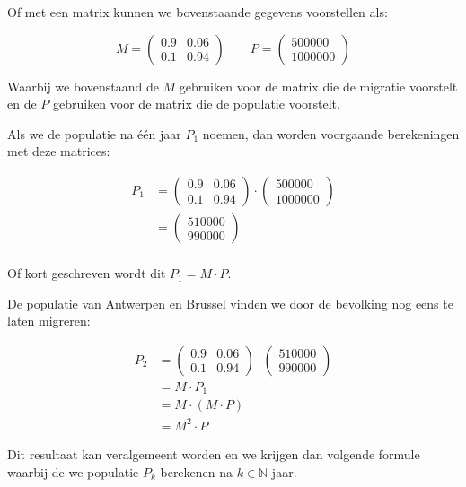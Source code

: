 \documentclass[12pt,twoside]{article}
\begin{document}
Of met een matrix kunnen we bovenstaande gegevens voorstellen als:

\[
  M=\begin{pmatrix}0.9 & 0.06\\ 0.1 & 0.94\end{pmatrix}\qquad
  P=\begin{pmatrix}500000\\1000000\end{pmatrix}
\]

Waarbij we bovenstaand de $M$ gebruiken voor de matrix die de migratie voorstelt en de $P$ gebruiken voor de matrix die de populatie voorstelt.

Als we de populatie na één jaar $P_1$ noemen, dan worden voorgaande berekeningen met deze matrices:

\begin{align*}
  P_1 &= \begin{pmatrix}0.9 & 0.06\\ 0.1 & 0.94\end{pmatrix} \cdot \begin{pmatrix}500000\\1000000\end{pmatrix}\\
  &= \begin{pmatrix}510000\\990000\end{pmatrix}\\
\end{align*}

Of kort geschreven wordt dit $P_1=M \cdot P$.

De populatie van Antwerpen en Brussel vinden we door de bevolking nog eens te laten migreren:

\begin{align*}
  P_2 &= \begin{pmatrix}0.9 & 0.06\\ 0.1 & 0.94\end{pmatrix} \cdot \begin{pmatrix}510000\\990000\end{pmatrix}\\
      &= M \cdot P_1\\
      &= M \cdot (M \cdot P)\\
      &= M^2 \cdot P
\end{align*}

Dit resultaat kan veralgemeent worden en we krijgen dan volgende formule waarbij de we populatie $P_k$ berekenen na $k \in \mathbb{N}$ jaar.
\end{document}
